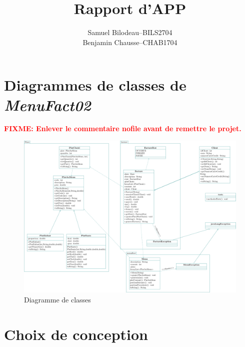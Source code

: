 \documentclass[a11paper, 11pt]{article}
\title{Rapport d'APP}
\author{
  \addtolength{\tabcolsep}{-0.4em}
  \begin{tabular}{rcl} %
  Samuel Bilodeau  & -- & BILS2704 \\ %
  Benjamin Chausse & -- & CHAB1704 \\
  \end{tabular}
}
\newcommand{\fixme}[1]{\textbf{\textcolor{red}{FIXME: #1}}}
\begin{document}
\maketitle
\newpage
\tableofcontents
\newpage
\section{Diagrammes de classes de \textit{MenuFact02}}

\fixme{Enlever le commentaire nofile avant de remettre le projet.}

\begin{figure}[H]
  \centering
  \includegraphics[width=\textwidth]{uml/uml.pdf}
  \caption{Diagramme de classes}
  \label{fig:uml}
\end{figure}

\section{Choix de conception}
\end{document}
